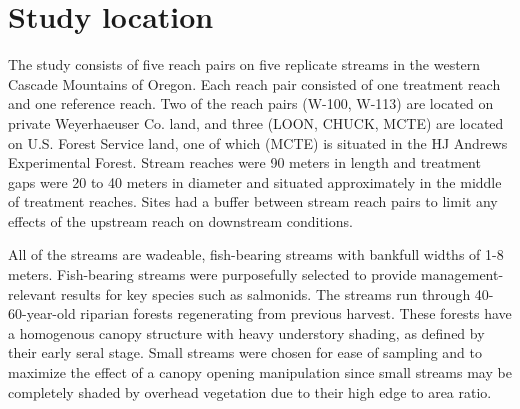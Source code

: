 \documentclass[double,12pt]{beavtex}
\begin{document}
  \section*{Study location}\label{study-location}
  
  The study consists of five reach pairs on five replicate streams in the
  western Cascade Mountains of Oregon. Each reach pair consisted of one
  treatment reach and one reference reach. Two of the reach pairs (W-100,
  W-113) are located on private Weyerhaeuser Co. land, and three (LOON,
  CHUCK, MCTE) are located on U.S. Forest Service land, one of which
  (MCTE) is situated in the HJ Andrews Experimental Forest. Stream reaches
  were 90 meters in length and treatment gaps were 20 to 40 meters in
  diameter and situated approximately in the middle of treatment reaches.
  Sites had a buffer between stream reach pairs to limit any effects of
  the upstream reach on downstream conditions.
  
  All of the streams are wadeable, fish-bearing streams with bankfull
  widths of 1-8 meters. Fish-bearing streams were purposefully selected to
  provide management-relevant results for key species such as salmonids.
  The streams run through 40-60-year-old riparian forests regenerating
  from previous harvest. These forests have a homogenous canopy structure
  with heavy understory shading, as defined by their early seral stage.
  Small streams were chosen for ease of sampling and to maximize the
  effect of a canopy opening manipulation since small streams may be
  completely shaded by overhead vegetation due to their high edge to area
  ratio.
  
  \begin{table}[t]
  
  \caption{\label{tab:table1}Study site attributes}
  \centering
  \end{table}
  
\end{document}
